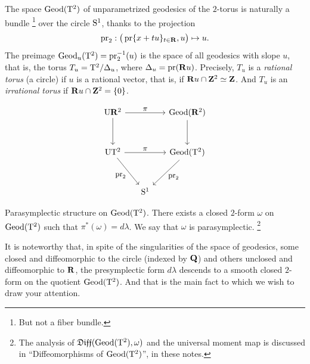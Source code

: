 The space $\operatorname{Geod}(\mathrm{T}^2)$ of unparametrized geodesics of the $2$-torus is naturally a bundle%
\footnote{But not a fiber bundle.}
over the circle $\mathrm{S}^1$,
thanks to the projection
$$
  \operatorname{pr}_2 : \big( \operatorname{pr} \{x+tu\}_{t\in \mathbf{R}}, u \big) \mapsto u.
  $$
The preimage $\operatorname{Geod}_u(\mathrm{T}^2) = \operatorname{pr}_2^{-1}(u)$ is the space of all geodesics with slope $u$,
that is,
the torus $T_u = \mathrm{T}^2/\Delta_u$,
where $\Delta_u = \operatorname{pr}(\mathbf{R} u)$.
Precisely,
$T_u$ is a \emph{rational torus} (a circle) if $u$ is a rational vector,
that is,
if $\mathbf{R} u \cap \mathbf{Z}^2 \simeq \mathbf{Z}$.
And $T_u$ is an \emph{irrational torus} \cite{DI83} if $\mathbf{R} u \cap \mathbf{Z}^2 = \{0\}$.

$$
  \begin{tikzcd}[column sep=1.5em, row sep=3em, every label/.append style = {font = \small}]
  \U\RR^2 \arrow[rr, "\pi"]  \arrow[d, swap, "\ "]       &                         & \Geod(\RR^2) \arrow[d,"\ "]   \\
  \U\Torus^2 \arrow[rr, "\pi"] \arrow[dr,swap,"\Proj_2"]   &                         & \Geod(\Torus^2) \arrow{dl}{\Proj_2} \\
  &          \Sph^1            &
  \end{tikzcd}
  $$

\begin{Article}{Parasymplectic structure on $\operatorname{Geod}(\mathrm{T}^2)$.}{}
  There exists a closed $2$-form $\omega$ on $\operatorname{Geod}(\mathrm{T}^2)$ such that $\pi^*(\omega) = d\lambda$.
  We say that $\omega$ is parasymplectic.%
  \footnote{The analysis of $\mathfrak{Diff}(\operatorname{Geod}(\mathrm{T}^2),\omega)$ and the universal moment map \cite[\textsection\,9.14]{PIZ13} is discussed in ``Diffeomorphisms of $\operatorname{Geod}(\mathrm{T}^2)$'',
  in these notes.}
\end{Article}

\Note It is noteworthy that,
in spite of the singularities of the space of geodesics,
some closed and diffeomorphic to the circle (indexed by $\mathbf{Q}$) and others unclosed and diffeomorphic to $\mathbf{R}$,
the presymplectic form $d\lambda$ descends to a smooth closed $2$-form on the quotient $\operatorname{Geod}(\mathrm{T}^2)$.
And that is the main fact to which we wish to draw your attention.

